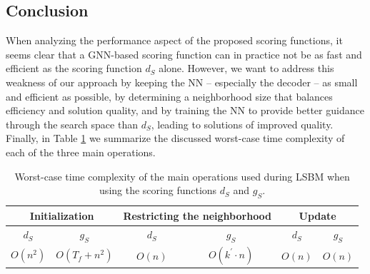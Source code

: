 \documentclass[draft,final]{vutinfth} %
\begin{document}
\subsection{Conclusion}
When analyzing the performance aspect of the proposed scoring functions, it seems clear that a GNN-based scoring function can in practice not be as fast and efficient as the scoring function $d_S$ alone. However, we want to address this weakness of our approach by keeping the NN -- especially the decoder -- as small and efficient as possible, by determining a neighborhood size that balances efficiency and solution quality, and by training the NN to provide better guidance through the search space than $d_S$, leading to solutions of improved quality. Finally, in Table \ref{tab:runtime-analysis} we summarize the discussed worst-case time complexity of each of the three main operations. 

\begin{table}
    \centering
    \begin{tabular}{cc | cc | cc}
        \toprule
        \multicolumn{2}{c}{Initialization} & \multicolumn{2}{c}{Restricting the neighborhood} & \multicolumn{2}{c}{Update}  \\ \hline
        $d_S$ & $g_S$ & $d_S$ & $g_S$ & $d_S$ & $g_S$  \\ 
        $O(n^2)$ & $O(T_f + n^2)$ & $O(n)$ & $O(k^\prime \cdot n)$ & $O(n)$ & $O(n)$ 
    \end{tabular}
    \caption{Worst-case time complexity of the main operations used during LSBM when using the scoring functions $d_S$ and $g_S$. }
    \label{tab:runtime-analysis}
\end{table}


\end{document}
